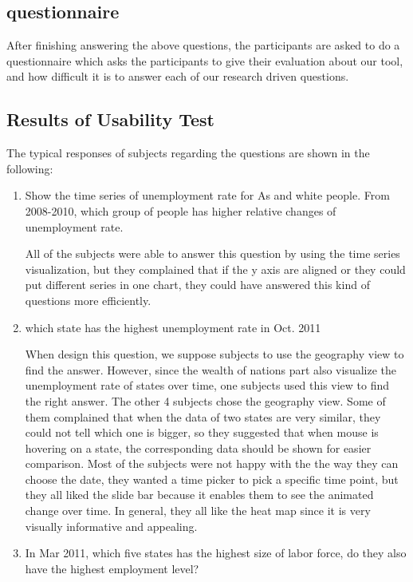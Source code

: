 \documentclass{sigchi}
\begin{document}
\subsection{questionnaire}
After finishing answering the above questions, the participants are asked to do a questionnaire which asks the participants to give their evaluation about our tool, and how difficult it is to answer each of our research driven questions.


\subsection{Results of Usability Test}
The typical responses of subjects regarding the questions are shown in the following:


\begin{enumerate}
\item    Show the time series of unemployment rate for As and white people. From 2008-2010, which group of people has higher relative changes of unemployment rate.


All of the subjects were able to answer this question by using the time series visualization, but they complained that if the y axis are aligned or they could put different series in one chart, they could have answered this kind of questions more efficiently.

\item    which state has the highest unemployment rate in Oct. 2011


When design this question, we suppose subjects to use the geography view to find the answer. However, since the wealth of nations part also visualize the unemployment rate of states over time, one subjects used this view to find the right answer. The other 4 subjects chose the geography view. Some of them complained that when the data of two states are very similar, they could not tell which one is bigger, so they suggested that when mouse is hovering on a state, the corresponding data should be shown for easier comparison. Most of the subjects were not happy with the the way they can choose the date, they wanted a time picker to pick a specific time point, but they all liked the slide bar because it enables them to see the animated change over time. In general, they all like the heat map since it is very visually informative and appealing.


\item    In Mar 2011, which five states has the highest size of labor force, do they also have the highest employment level?


\end{enumerate}
\end{document}
